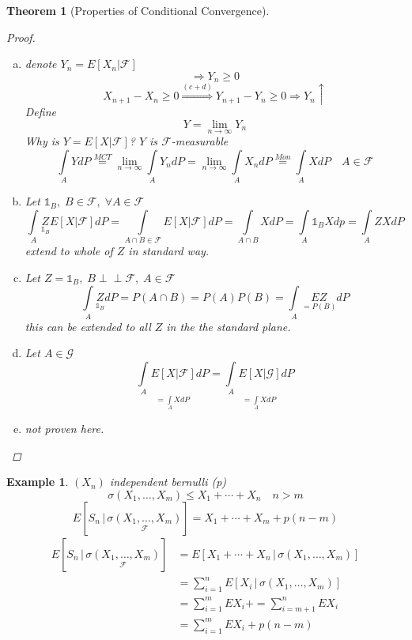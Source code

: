\documentclass[12pt]{article}
\def\FF{\mathbb{F}}
\def\FF{\mathcal{F}}
\newcommand{\Perp}{\perp \! \! \! \perp}
\newtheorem{theorem}{Theorem}[section]
\newtheorem{example}{Example}[section]
\begin{document}
\begin{theorem}[Properties of Conditional Convergence]
\begin{proof}
\begin{enumerate}[(a):]
\[0 = \int\limits_{A}XdP - \int\limits_{A}YdP = \int\limits_{A}\underbrace{(\underset{\geq 0}{X}  - \underset{< - \tfrac{1}{k}}{Y})}_{\geq \, \tfrac{1}{k}}dP\]
\item denote $Y_n = E[X_n|\FF]$
\[\Rightarrow Y_n \geq 0\]
\[X_{n+1} - X_n \geq 0 \overset{(c+d)}{\Rightarrow} Y_{n+1} - Y_n \geq 0 \Rightarrow Y_n \uparrow \]
Define 
\[Y = \lim_{n \rightarrow \infty} Y_n \]
Why is $Y = E[X|\FF]$? $Y$ is $\FF$-measurable 
\[ \int\limits_{A}YdP \overset{MCT}{=}\lim_{n \rightarrow \infty}\int\limits_{A}Y_n dP = \lim_{n \rightarrow \infty}\int\limits_{A}X_n dP \overset{Mon}{=} \int\limits_{A}XdP \quad A \in \FF\]
\item Let ${\mathbb 1}_B, \; B\in \FF, \; \forall A \in \FF$
\[\int\limits_{A}\underset{{\mathbb 1}_B}{Z}E[X|\FF]dP = \int\limits_{A\cap B \in \FF}E[X|\FF]dP = \int\limits_{A\cap B}XdP = \int\limits_{A}{\mathbb 1}_B Xdp = \int\limits_{A}ZXdP\]
extend to whole of $Z$ in standard way.\\
\item Let $Z={\mathbb 1}_B , \; B \Perp \FF, \; A \in \FF$
\[  \int\limits_{A}\underset{{\mathbb 1}_B}{Z}dP = P(A\cap B) = P(A)P(B) = \int\limits_{A}\underset{= P(B)}{EZ}dP\]
this can be extended to all $Z$ in the the standard plane.\\
\item Let $A \in \mathcal{G}$ 
\[\underset{= \int\limits_{A}XdP}{\int\limits_{A}E[X|\FF]dP} = \underset{= \int\limits_{A}XdP}{\int\limits_{A}E[X|\mathcal{G}]dP}  \]
\item not proven here.
\end{enumerate}
\end{proof}
\end{theorem}

\begin{example}
$(X_n)$ independent bernulli (p)
\[\sigma(X_1, \dots , X_m) \leq X_1 + \cdots + X_n \quad n >m\]
\[E[S_n \,|\, \underset{\FF}{\sigma(X_1, \dots , X_m)} ] =  X_1 + \cdots + X_m +p(n-m)\]
\begin{align*}
E[S_n \,|\, \underset{\FF}{\sigma(X_1, \dots , X_m)} ] &=  E[X_1 + \cdots + X_n \,| \,\sigma(X_1, \dots , X_m) ]\\
&= \sum_{i=1}^{n}E[X_i \,| \,\sigma(X_1, \dots , X_m) ]\\
&= \sum_{i=1}^{m}EX_i + = \sum_{i=m +1}^{n}EX_i\\
&=  \sum_{i=1}^{m}EX_i +p(n-m) \end{align*}
\end{example}
\end{document}
